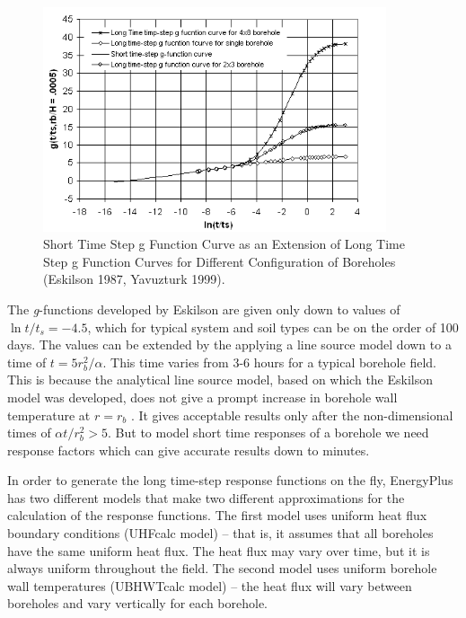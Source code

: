 \begin{figure}[hbtp] %
\centering
\includegraphics[width=0.9\textwidth, height=0.9\textheight, keepaspectratio=true]{media/image5651.png}
\caption{Short Time Step g Function Curve as an Extension of Long Time Step g Function Curves for Different Configuration of Boreholes (Eskilson 1987, Yavuzturk 1999). \protect \label{fig:short-time-step-g-function-curve-as-an}}
\end{figure}

The \emph{g}-functions developed by Eskilson are given only down to values of $\ln t/t_s = -4.5$, which for typical system and soil types can be on the order of 100 days. The values can be extended by the applying a line source model down to a time of $t = 5r_b^2/\alpha$. This time varies from 3-6 hours for a typical borehole field. This is because the analytical line source model, based on which the Eskilson model was developed, does not give a prompt increase in borehole wall temperature at \(r = {r_b}\) . It gives acceptable results only after the non-dimensional times of \(\alpha t/r_b^2 > 5\). But to model short time responses of a borehole we need response factors which can give accurate results down to minutes.

In order to generate the long time-step response functions on the fly, EnergyPlus has two different models that make two different approximations for the calculation of the response functions. The first model uses uniform heat flux boundary conditions (UHFcalc model) – that is, it assumes that all boreholes have the same uniform heat flux. The heat flux may vary over time, but it is always uniform throughout the field. The second model uses uniform borehole wall temperatures (UBHWTcalc model) – the heat flux will vary between boreholes and vary vertically for each borehole.

